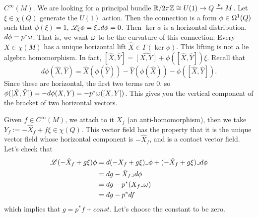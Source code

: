  \setcounter{lecture}{21}

 $C^\infty(M)$.  We are looking for a principal bundle $\mathbb{R}/2\pi\mathbb{Z} \cong U(1)\to
 Q\xrightarrow{p} M$.  Let $\xi\in \chi(Q)$ generate the $U(1)$ action.  Then the
 connection is a form $\phi\in \Omega^1(Q)$ such that $\phi(\xi)=1$, $\mathscr{L}_\xi \phi =
 \xi\lrcorner d\phi = 0$.  Then $\ker \phi$ is a horizontal distribution.  $d\phi =
 p^*\omega$.  That is, we want $\omega$ to be the curvature of this connection.  Every $X\in
 \chi(M)$ has a unique horizontal lift $\hat X\in \Gamma(\ker \phi)$.  This lifting is
 not a lie algebra homomorphism.  In fact, $[\hat X,\hat Y] =
 \widehat{[X,Y]}+\phi([\hat X,\hat Y])\xi$.  Recall that \[d\phi (\hat X,\hat Y) =
 \hat X(\phi(\hat Y)) - \hat Y(\phi(\hat X)) - \phi([\hat X,\hat Y]).\]  Since these
 are horizontal, the first two terms are 0.  so $\phi([\hat X,\hat Y]) = -d\phi(X,Y)
 = -p^*\omega([X,Y])$.  This gives you the vertical component of the bracket of two
 horizontal vectors.

 Given $f\in C^\infty(M)$, we attach to it $X_f$ (an anti-homomorphism), then we take
$Y_f := - \hat X_f + f\xi \in \chi(Q)$.  This vector field has the property that it is
the unique vector field whose horizontal component is $-\hat X_f$, and is a contact
vector field.  Let's check that
\begin{align*}
  \mathscr{L}(-\hat X_f + g\xi)\phi &= d(-X_f +g\xi)\lrcorner \phi + (-\hat X_f + g\xi)
  \lrcorner d\phi\\
  &= dg - \hat X_f\lrcorner d\phi\\
  &= dg - p^*(X_f\lrcorner \omega)\\
  &= dg - p^*df
\end{align*}
which implies that $g = p^*f +const$.  Let's choose the constant to be zero.

